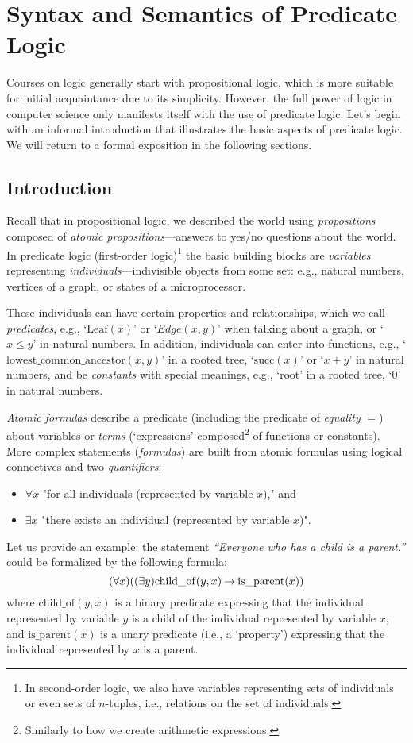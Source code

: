 \chapter{Syntax and Semantics of Predicate Logic}

Courses on logic generally start with propositional logic, which is more suitable for initial acquaintance due to its simplicity. However, the full power of logic in computer science only manifests itself with the use of predicate logic.
Let's begin with an informal introduction that illustrates the basic aspects of predicate logic. We will return to a formal exposition in the following sections.

\section{Introduction}
Recall that in propositional logic, we described the world using \emph{propositions} composed of \emph{atomic propositions}—answers to yes/no questions about the world. In predicate logic (first-order logic)\footnote{In second-order logic, we also have variables representing sets of individuals or even sets of $n$-tuples, i.e., relations on the set of individuals.} the basic building blocks are \emph{variables} representing \emph{individuals}—indivisible objects from some set: e.g., natural numbers, vertices of a graph, or states of a microprocessor.

These individuals can have certain properties and relationships, which we call \emph{predicates}, e.g., `$\mathrm{Leaf}(x)$' or `$Edge(x,y)$' when talking about a graph, or `$x\leq y$' in natural numbers. In addition, individuals can enter into functions, e.g., `$\mathrm{lowest\_common\_ancestor}(x,y)$' in a rooted tree, `$\mathrm{succ}(x)$' or `$x+y$' in natural numbers, and be \emph{constants} with special meanings, e.g., `$\mathrm{root}$' in a rooted tree, `$0$' in natural numbers.

\emph{Atomic formulas} describe a predicate (including the predicate of \emph{equality} $=$) about variables or \emph{terms} (`expressions' composed\footnote{Similarly to how we create arithmetic expressions.} of functions or constants). More complex statements (\emph{formulas}) are built from atomic formulas using logical connectives and two \emph{quantifiers}:
\begin{itemize}
    \item $\forall x$ "for all individuals (represented by variable $x$)," and
    \item $\exists x$ "there exists an individual (represented by variable $x$)".
\end{itemize}
Let us provide an example: the statement \textit{``Everyone who has a child is a parent.''} could be formalized by the following formula:
$$
(\forall x)((\exists y)\mathrm{child\_of}(y,x)\mathbin{\rightarrow}\mathrm{is\_parent}(x))
$$
where $\mathrm{child\_of}(y,x)$ is a binary predicate expressing that the individual represented by variable $y$ is a child of the individual represented by variable $x$, and $\mathrm{is\_parent}(x)$ is a unary predicate (i.e., a `property') expressing that the individual represented by $x$ is a parent.

